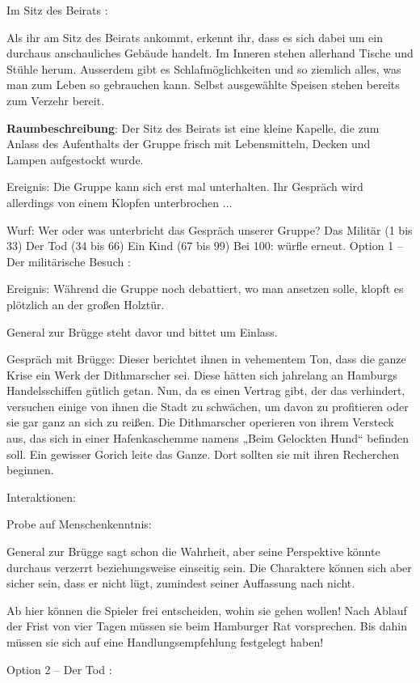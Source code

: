 
Im Sitz des Beirats
:

Als ihr am Sitz des Beirats ankommt, erkennt ihr, dass es sich dabei um ein durchaus anschauliches Gebäude handelt. Im Inneren stehen allerhand Tische und Stühle herum. Ausserdem gibt es Schlafmöglichkeiten und so ziemlich alles, was man zum Leben so gebrauchen kann. Selbst ausgewählte Speisen stehen bereits zum Verzehr bereit.

\textbf{Raumbeschreibung}: Der Sitz des Beirats ist eine kleine Kapelle, die zum Anlass des Aufenthalts der Gruppe frisch mit Lebensmitteln, Decken und Lampen aufgestockt wurde.

Ereignis: Die Gruppe kann sich erst mal unterhalten. Ihr Gespräch wird allerdings von einem Klopfen unterbrochen ...

Wurf: Wer oder was unterbricht das Gespräch unserer Gruppe?
Das Militär (1 bis 33)
Der Tod (34 bis 66)
Ein Kind (67 bis 99)
Bei 100: würfle erneut.
Option 1 – Der militärische Besuch
:

Ereignis: Während die Gruppe noch debattiert, wo man ansetzen solle, klopft es plötzlich an der großen Holztür.

General zur Brügge steht davor und bittet um Einlass.

Gespräch mit Brügge: Dieser berichtet ihnen in vehementem Ton, dass die ganze Krise ein Werk der Dithmarscher sei. Diese hätten sich jahrelang an Hamburgs Handelsschiffen gütlich getan. Nun, da es einen Vertrag gibt, der das verhindert, versuchen einige von ihnen die Stadt zu schwächen, um davon zu profitieren oder sie gar ganz an sich zu reißen. Die Dithmarscher operieren von ihrem Versteck aus, das sich in einer Hafenkaschemme namens „Beim Gelockten Hund“ befinden soll. Ein gewisser Gorich leite das Ganze. Dort sollten sie mit ihren Recherchen beginnen.

Interaktionen:

Probe auf Menschenkenntnis:

General zur Brügge sagt schon die Wahrheit, aber seine Perspektive könnte durchaus verzerrt beziehungsweise einseitig sein.
Die Charaktere können sich aber sicher sein, dass er nicht lügt, zumindest seiner Auffassung nach nicht.

Ab hier können die Spieler frei entscheiden, wohin sie gehen wollen! Nach Ablauf der Frist von vier Tagen müssen sie beim Hamburger Rat vorsprechen. Bis dahin müssen sie sich auf eine Handlungsempfehlung festgelegt haben!


Option 2 – Der Tod
:

